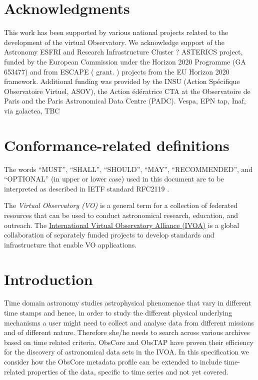 \documentclass[11pt,a4paper]{ivoa}
\begin{document}
\section*{Acknowledgments}
This work has been supported by various national projects related to the development of the virtual Observatory.
 We acknowledge support of the Astronomy ESFRI and Research Infrastructure Cluster ? ASTERICS project, funded by the European Commission under the Horizon 2020 Programme (GA 653477) and from ESCAPE ( grant. ) projects from the  EU Horizon 2020  framework.
 Additional funding was provided by the INSU (Action Sp\'{e}cifique Observatoire Virtuel, ASOV), the Action \'ed\'eratrice CTA at the Observatoire de Paris and the Paris Astronomical Data Centre (PADC).
Vespa, EPN tap, Inaf, via galactea, TBC
\section*{Conformance-related definitions}

The words ``MUST'', ``SHALL'', ``SHOULD'', ``MAY'', ``RECOMMENDED'', and
``OPTIONAL'' (in upper or lower case) used in this document are to be
interpreted as described in IETF standard RFC2119 \citep{std:RFC2119}.

The \emph{Virtual Observatory (VO)} is a
general term for a collection of federated resources that can be used
to conduct astronomical research, education, and outreach.
The \href{https://www.ivoa.net}{International
Virtual Observatory Alliance (IVOA)} is a global
collaboration of separately funded projects to develop standards and
infrastructure that enable VO applications.



\section{Introduction}

Time domain astronomy studies astrophysical phenomenae that vary in different time stamps and hence, in order to study the different physical underlying mechanisms a user might need to collect and analyse data from different missions and of different nature. Therefore she/he needs to search across various archives based on time related criteria.
ObsCore and ObsTAP  \cite{2017ivoa.spec.0509L} have proven their efficiency for the discovery of astronomical data sets in the IVOA. 
In this specification we consider how the ObsCore metadata profile can be extended to include time-related properties of the data, specific to time series and not yet covered.
\end{document}
